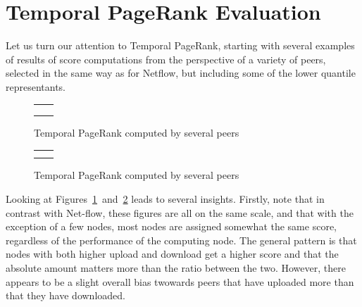 \documentclass[a4paper,11pt]{book}
\theoremstyle{definition}
\begin{document}
\section{Temporal PageRank Evaluation}

Let us turn our attention to Temporal PageRank, starting with several examples of results of
score computations from the perspective of a variety of peers, selected in the same way as for
Netflow, but including some of the lower quantile representants.

\begin{figure}[ht]
    \centering
    \begin{tabular}[ht]{cc}
         &
         \\
         &
         \\

         &
         \\
    \end{tabular}
    \caption{Temporal PageRank computed by several peers}
    \label{fig:tpr_per_peer_1}
\end{figure}

\begin{figure}[ht]
    \centering
    \begin{tabular}[ht]{cc}
         & 

         \\ 
         &
         \\

    \end{tabular}
    \caption{Temporal PageRank computed by several peers}
    \label{fig:tpr_per_peer_2}
\end{figure}


Looking at Figures~\ref{fig:tpr_per_peer_1}~and~\ref{fig:tpr_per_peer_2} leads to several insights. Firstly, note that
in contrast with Net-flow, these figures are all on the same scale, and that with the
exception of a few nodes, most nodes are assigned somewhat the same score, regardless
of the performance of the computing node. The general pattern is that nodes with both
higher upload and download get a higher score and that the absolute amount matters more
than the ratio between the two. However, there appears to be a slight overall bias
twowards peers that have uploaded more than that they have downloaded.
\end{document}
